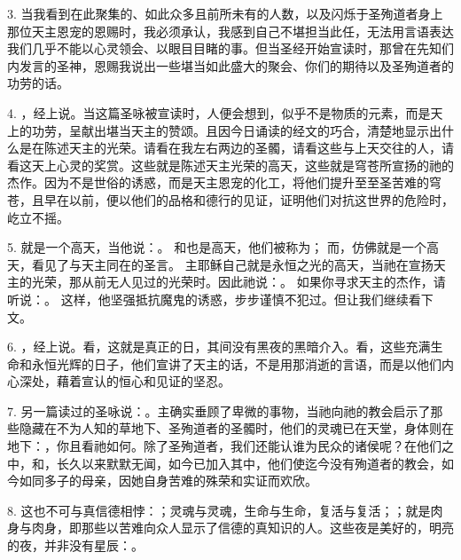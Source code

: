 3. 当我看到在此聚集的、如此众多且前所未有的人数，以及闪烁于圣殉道者身上那位天主恩宠的恩赐时，我必须承认，我感到自己不堪担当此任，无法用言语表达我们几乎不能以心灵领会、以眼目目睹的事。但当圣经开始宣读时，那曾在先知们内发言的圣神，恩赐我说出一些堪当如此盛大的聚会、你们的期待以及圣殉道者的功劳的话。\par

4. ，经上说。当这篇圣咏被宣读时，人便会想到，似乎不是物质的元素，而是天上的功劳，呈献出堪当天主的赞颂。且因今日诵读的经文的巧合，清楚地显示出什么是在陈述天主的光荣。请看在我左右两边的圣髑，请看这些与上天交往的人，请看这天上心灵的奖赏。这些就是陈述天主光荣的高天，这些就是穹苍所宣扬的祂的杰作。因为不是世俗的诱惑，而是天主恩宠的化工，将他们提升至至圣苦难的穹苍，且早在以前，便以他们的品格和德行的见证，证明他们对抗这世界的危险时，屹立不摇。\par

5. 就是一个高天，当他说：。 和也是高天，他们被称为； 而，仿佛就是一个高天，看见了与天主同在的圣言。 主耶稣自己就是永恒之光的高天，当祂在宣扬天主的光荣，那从前无人见过的光荣时。因此祂说：。 如果你寻求天主的杰作，请听说：。 这样，他坚强抵抗魔鬼的诱惑，步步谨慎不犯过。但让我们继续看下文。\par

6. ，经上说。看，这就是真正的日，其间没有黑夜的黑暗介入。看，这些充满生命和永恒光辉的日子，他们宣讲了天主的话，不是用那消逝的言语，而是以他们内心深处，藉着宣认的恒心和见证的坚忍。\par

7. 另一篇读过的圣咏说：。主确实垂顾了卑微的事物，当祂向祂的教会启示了那些隐藏在不为人知的草地下、圣殉道者的圣髑时，他们的灵魂已在天堂，身体则在地下：，你且看祂如何。除了圣殉道者，我们还能认谁为民众的诸侯呢？在他们之中，和，长久以来默默无闻，如今已加入其中，他们使迄今没有殉道者的教会，如今如同多子的母亲，因她自身苦难的殊荣和实证而欢欣。\par

8. 这也不可与真信德相悖：；灵魂与灵魂，生命与生命，复活与复活；；就是肉身与肉身，即那些以苦难向众人显示了信德的真知识的人。这些夜是美好的，明亮的夜，并非没有星辰：。\par

